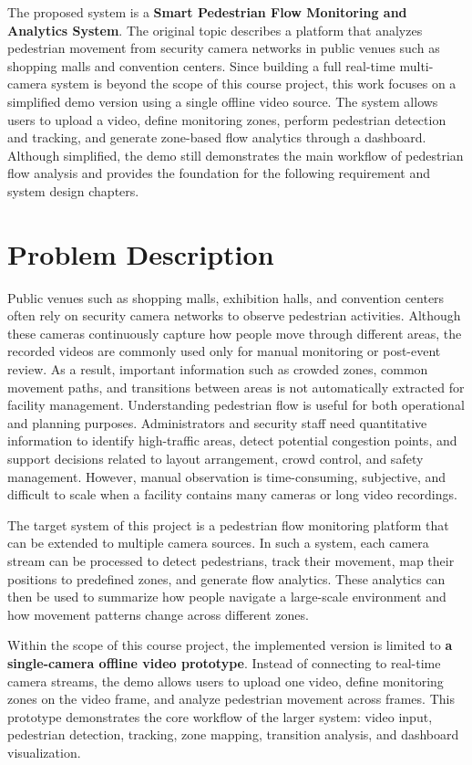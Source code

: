 \documentclass[12pt,a4paper]{report}
\begin{document}
The proposed system is a \textbf{Smart Pedestrian Flow Monitoring and Analytics System}. The original topic describes a platform that analyzes pedestrian movement from security camera networks in public venues such as shopping malls and convention centers. Since building a full real-time multi-camera system is beyond the scope of this course project, this work focuses on a simplified demo version using a single offline video source. The system allows users to upload a video, define monitoring zones, perform pedestrian detection and tracking, and generate zone-based flow analytics through a dashboard. Although simplified, the demo still demonstrates the main workflow of pedestrian flow analysis and provides the foundation for the following requirement and system design chapters.


\section{Problem Description}
\label{sec:problem-description}

Public venues such as shopping malls, exhibition halls, and convention centers often rely on security camera networks to observe pedestrian activities. Although these cameras continuously capture how people move through different areas, the recorded videos are commonly used only for manual monitoring or post-event review. 
As a result, important information such as crowded zones, common movement paths, and transitions between areas is not automatically extracted for facility management.
Understanding pedestrian flow is useful for both operational and planning purposes. 
Administrators and security staff need quantitative information to identify high-traffic areas, detect potential congestion points, and support decisions related to layout arrangement, crowd control, and safety management. 
However, manual observation is time-consuming, subjective, and difficult to scale when a facility contains many cameras or long video recordings.

The target system of this project is a pedestrian flow monitoring platform that can be extended to multiple camera sources. 
In such a system, each camera stream can be processed to detect pedestrians, track their movement, map their positions to predefined zones, and generate flow analytics. 
These analytics can then be used to summarize how people navigate a large-scale environment and how movement patterns change across different zones.

Within the scope of this course project, the implemented version is limited to \textbf{a single-camera offline video prototype}. 
Instead of connecting to real-time camera streams, the demo allows users to upload one video, define monitoring zones on the video frame, and analyze pedestrian movement across frames. 
This prototype demonstrates the core workflow of the larger system: video input, pedestrian detection, tracking, zone mapping, transition analysis, and dashboard visualization.
\end{document}

